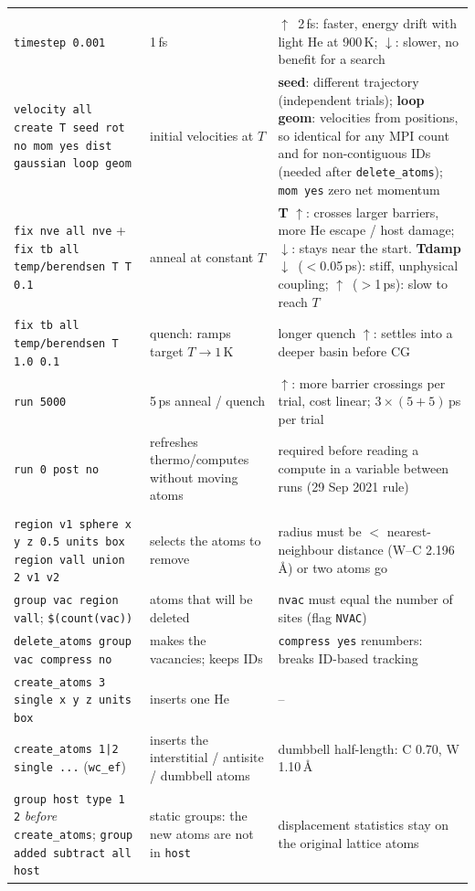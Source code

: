 \documentclass[10pt]{article}
\newcommand{\cmd}[1]{\texttt{\small #1}}
\newcommand{\up}{\textcolor{org}{$\uparrow$}}
\newcommand{\dn}{\textcolor{acc}{$\downarrow$}}
\begin{document}
\begin{xltabular}{\linewidth}{L{5.0cm} L{6.1cm} Y}
 \\
\cmd{timestep 0.001} & 1\,fs & \up\ 2\,fs: faster, energy drift with light He at 900\,K; \dn: slower, no benefit for a search \\
\cmd{velocity all create T seed rot no mom yes dist gaussian loop geom} & initial velocities at $T$ & \textbf{seed}: different trajectory (independent trials); \textbf{loop geom}: velocities from positions, so identical for any MPI count and for non-contiguous IDs (needed after \cmd{delete\_atoms}); \cmd{mom yes} zero net momentum \\
\cmd{fix nve all nve} + \cmd{fix tb all temp/berendsen T T 0.1} & anneal at constant $T$ & \textbf{T} \up: crosses larger barriers, more He escape / host damage; \dn: stays near the start. \textbf{Tdamp} \dn\ ($<$0.05\,ps): stiff, unphysical coupling; \up\ ($>$1\,ps): slow to reach $T$ \\
\cmd{fix tb all temp/berendsen T 1.0 0.1} & quench: ramps target $T\to1$\,K & longer quench \up: settles into a deeper basin before CG \\
\cmd{run 5000} & 5\,ps anneal / quench & \up: more barrier crossings per trial, cost linear; $3\times(5+5)$\,ps per trial \\
\cmd{run 0 post no} & refreshes thermo/computes without moving atoms & required before reading a compute in a variable between runs (29 Sep 2021 rule) \\
 \\
\cmd{region v1 sphere x y z 0.5 units box} \newline \cmd{region vall union 2 v1 v2} & selects the atoms to remove & radius must be $<$ nearest-neighbour distance (W--C 2.196\,\AA) or two atoms go \\
\cmd{group vac region vall}; \cmd{\$(count(vac))} & atoms that will be deleted & \cmd{nvac} must equal the number of sites (flag \cmd{NVAC}) \\
\cmd{delete\_atoms group vac compress no} & makes the vacancies; keeps IDs & \cmd{compress yes} renumbers: breaks ID-based tracking \\
\cmd{create\_atoms 3 single x y z units box} & inserts one He & -- \\
\cmd{create\_atoms 1|2 single ...} (\cmd{wc\_ef}) & inserts the interstitial / antisite / dumbbell atoms & dumbbell half-length: C 0.70, W 1.10\,\AA \\
\cmd{group host type 1 2} \emph{before} \cmd{create\_atoms}; \cmd{group added subtract all host} & static groups: the new atoms are not in \cmd{host} & displacement statistics stay on the original lattice atoms \\

\end{xltabular}
\end{document}
